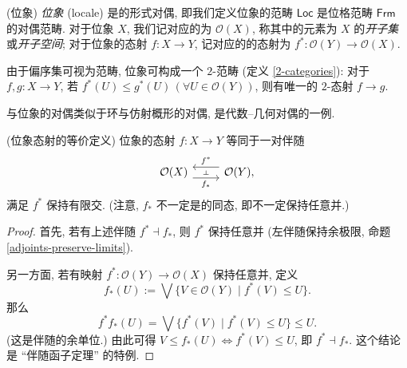 \begin{definition}
	[label={locale-definition}]
	{(位象)}
	\emph{位象} (locale) 是\fm{}的形式对偶,
	即我们定义位象的范畴 $\mathsf {Loc}$ 是位格范畴 $\mathsf {Frm}$ 的对偶范畴.
	对于位象 $X$, 我们记对应的\fm{}为 $\mathcal O(X)$, 称其中的元素为 $X$ 的\emph{开子集}或\emph{开子空间}; 对于位象的态射 $f \colon X \to Y$,
	记对应的\fm{}的态射为 $f^* \colon \mathcal O(Y) \to \mathcal O(X)$.
	
	由于偏序集可视为范畴, 位象可构成一个 $2$-范畴 (定义 \ref{2-categories}): 对于 $f,g\colon X\to Y$, 若 $f^*(U)\leq g^*(U)\,(\forall U\in\mathcal O(Y))$, 则有唯一的 $2$-态射 $f\to g$.
\end{definition}

\begin{remark}
	{}
	\fm{}与位象的对偶类似于环与仿射概形的对偶,
	是代数--几何对偶的一例.
\end{remark}

\begin{prop}
	[label={morphism-of-locales-as-adjunction}]
	{(位象态射的等价定义)}
	位象的态射 $f\colon X\to Y$ 等同于一对伴随\footnotemark{}
	\[\begin{tikzcd}[ampersand replacement=\&]
		{\mathcal O(X)} \& {\mathcal O(Y),}
		\arrow[""{name=0, anchor=center, inner sep=0}, "{f^*}"', shift right=2, from=1-2, to=1-1]
		\arrow[""{name=1, anchor=center, inner sep=0}, "{f_*}"', shift right=2, from=1-1, to=1-2]
		\arrow["\dashv"{anchor=center, rotate=-90}, draw=none, from=0, to=1]
	\end{tikzcd}\]
	满足 $f^*$ 保持有限交. (注意, $f_*$ 不一定是\fm{}的同态, 即不一定保持任意并.)
\end{prop}
\begin{proof}
	首先, 若有上述伴随 $f^*\dashv f_*$, 则 $f^*$ 保持任意并 (左伴随保持余极限, 命题 \ref{adjoints-preserve-limits}).
	
	另一方面, 若有映射 $f^*\colon \mathcal O(Y)\to\mathcal O(X)$ 保持任意并, 定义
	\[
	f_*(U) := \bigvee \{V\in\mathcal O(Y)\mid f^*(V)\leq U\}.
	\]
	那么
	\[
	f^*f_*(U) = \bigvee \{f^*(V)\mid f^*(V)\leq U\} \leq U.
	\]
	(这是伴随的余单位.)
	由此可得 $V\leq f_*(U) \Leftrightarrow f^*(V)\leq U$, 即 $f^*\dashv f_*$. 这个结论是 ``伴随函子定理'' 的特例.
\end{proof}

